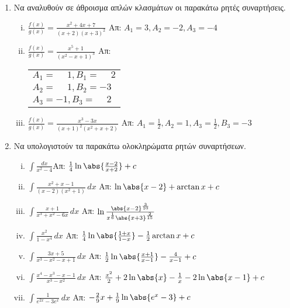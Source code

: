 


\pagestyle{askhseis}
\everymath{\displaystyle}





\begin{center}
  \minibox{\bfseries\large \textcolor{Col1}{Ασκήσεις στα Αόριστα Ολοκληρώματα}}
\end{center}

\vspace{\baselineskip}

\begin{enumerate}
  \item \label{ask:anal} Να αναλυθούν σε άθροισμα απλών κλασμάτων οι παρακάτω ρητές 
    συναρτήσεις.
    \begin{enumerate}[i)]
      \item $\frac{f(x)}{g(x)}=\frac{x^2+4x+7}{(x+2)(x+3)^2}$ 
        \hfill Απ: $A_1=3, A_2=-2, A_3=-4$
      \item $\frac{f(x)}{g(x)}=\frac{x^5+1}{(x^2-x+1)^3}$ 
        \hfill Απ: \begin{tabular}{l} $A_1=\phantom{-}1, B_1=\phantom{-}2$ \\ 
          $A_2=\phantom{-}1, B_2=-3$ \\ $A_3=-1, B_3=\phantom{-}2$
        \end{tabular}
      \item $\frac{f(x)}{g(x)}=\frac{x^3-3x}{(x+1)^2(x^2+x+2)}$ 
        \hfill Απ: $A_1=\frac{1}{2}, A_2=1, A_3=\frac{1}{2}, B_3=-3$
    \end{enumerate}

  \item \label{ask:rhtes} Να υπολογιστούν τα παρακάτω ολοκληρώματα ρητών συναρτήσεων.
    \begin{enumerate}[i)]
      \item $\int\frac{dx}{x^2-4}$\hfill Απ: $\frac{1}{4}\ln\abs{\frac{x-2}{x+2}}+c$
      \item $\int\frac{x^2+x-1}{(x-2)(x^2+1)}\,dx$ \hfill Απ: $\ln\abs{x-2}+\arctan x+c$
      \item $\int\frac{x+1}{x^3+x^2-6x}\,dx$ 
        \hfill Απ: $\ln\frac{\abs{x-2}^{\frac{3}{10}}}{x^{\frac{1}{6}}\abs{x+3}^
        {\frac{2}{15}}}$
      \item $\int\frac{x^2}{1-x^4}\,dx$ 
        \hfill Απ: $\frac{1}{4}\ln\abs{\frac{1+x}{1-x}}-\frac{1}{2}\arctan x+c$
      \item $\int\frac{3x+5}{x^3-x^2-x+1}\, dx$ 
        \hfill Απ: $\frac{1}{2}\ln\abs{\frac{x+1}{x-1}}-\frac{4}{x-1}+c$ 
      \item $\int\frac{x^4-x^3-x-1}{x^3-x^2}\,dx$ 
        \hfill Απ: $\frac{x^2}{2}+2\ln\abs{x}-\frac{1}{x}-2\ln\abs{x-1}+c$
      \item \label{ex:seven} $\int\frac{1}{e^{2x}-3e^{x}}\,dx$ 
        \hfill Απ: $-\frac{2}{9}x+\frac{1}{9}\ln\abs{e^x-3}+c$
    \end{enumerate}


\end{enumerate}
